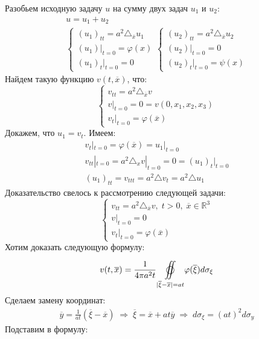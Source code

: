 \begin{Proof}
	Разобьем исходную задачу $u$ на сумму двух задач $u_1$ и $u_2$:
	$$\begin{gathered}
		u = u_1 + u_2 \\
	\begin{cases}
		(u_1)_{tt} = a^2 \triangle_{\overline{x}} u_1 \\
		(u_1)|_{t = 0} = \varphi (x) \\
		(u_1)_t |_{t = 0} = 0
	\end{cases}
	\begin{cases}
		(u_2)_{tt} = a^2 \triangle_{\overline{x}} u_2 \\
		(u_2)|_{t = 0} = 0 \\
		(u_2)_t |_{t = 0} = \psi (x)
	\end{cases}
	\end{gathered}$$
	Найдем такую функцию $v(t, \overline{x})$, что:
	$$\begin{cases}
		v_{tt} = a^2 \triangle_{\overline{x}} v \\
		v|_{t = 0} = 0 = v (0, x_1, x_2, x_3) \\
		v_t |_{t = 0} = \varphi (\overline{x})
	\end{cases}$$
	Докажем, что $u_1 = v_t$. Имеем:
	$$\begin{gathered}
		v_t|_{t=0} = \varphi (\overline{x}) = u_1|_{t=0}\\
		v_{tt}|_{t=0} = a^2 \triangle_x v|_{t=0} = 0 = (u_1)_t|_{t=0}\\
		(u_1)_{tt} = v_{ttt} = a^2 \triangle v_t = a^2 \triangle u_1
 	\end{gathered}$$
	Доказательство свелось к рассмотрению следующей задачи:
	$$\begin{cases}
		v_{tt} = a^2 \triangle_{\overline{x}} v, \; t > 0, \; \overline{x} \in \mathbb{R}^3 \\
		v|_{t = 0} = 0 \\
		v_t |_{t = 0} = \varphi (\overline{x})
	\end{cases}$$
	Хотим доказать следующую формулу:
	$$v(t, \overline{x}) = \frac{1}{4 \pi a^2 t}\underset{|\overline{\xi} - \overline{x}|=at}{\overset{}{\varoiint}}\varphi (\overline{\xi})d \sigma_{\xi}$$
	Сделаем замену координат:
	$$\begin{gathered}
		\overline{y}  = \frac{1}{at} (\overline{\xi} - \overline{x})\; \Rightarrow \;  \overline{\xi} = \overline{x} + a t \overline{y} \; \Rightarrow \;  d \sigma_{\xi} = (at)^2 d \sigma_{y}
	\end{gathered}$$
	Подставим в формулу:

\end{Proof}

